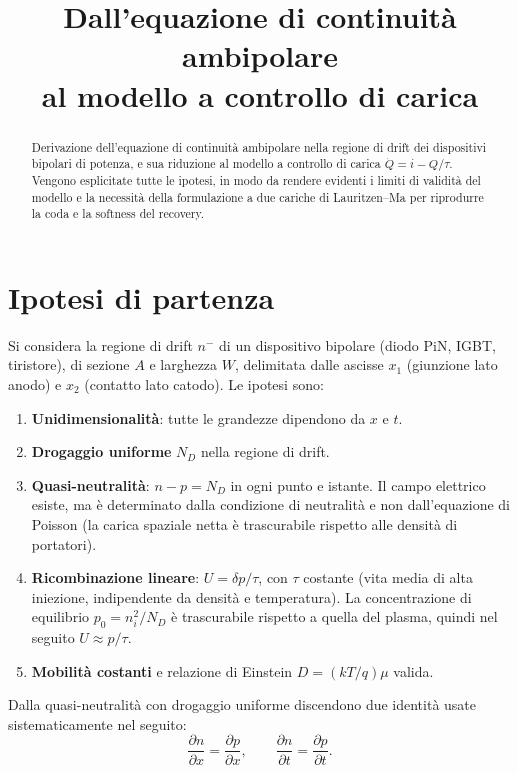 \documentclass[11pt,a4paper]{article}
\title{Dall'equazione di continuit\`a ambipolare\\ al modello a controllo di carica}
\author{}
\date{}
\newcommand{\dpar}[2]{\frac{\partial #1}{\partial #2}}
\begin{document}
\maketitle

\begin{abstract}
\noindent
Derivazione dell'equazione di continuit\`a ambipolare nella regione di drift dei
dispositivi bipolari di potenza, e sua riduzione al modello a controllo di carica
$\dot{Q} = i - Q/\tau$. Vengono esplicitate tutte le ipotesi, in modo da rendere
evidenti i limiti di validit\`a del modello e la necessit\`a della formulazione a
due cariche di Lauritzen--Ma per riprodurre la coda e la softness del recovery.
\end{abstract}

\section{Ipotesi di partenza}

Si considera la regione di drift $n^-$ di un dispositivo bipolare (diodo PiN, IGBT,
tiristore), di sezione $A$ e larghezza $W$, delimitata dalle ascisse $x_1$ (giunzione
lato anodo) e $x_2$ (contatto lato catodo). Le ipotesi sono:

\begin{enumerate}
  \item \textbf{Unidimensionalit\`a}: tutte le grandezze dipendono da $x$ e $t$.
  \item \textbf{Drogaggio uniforme} $N_D$ nella regione di drift.
  \item \textbf{Quasi-neutralit\`a}: $n - p = N_D$ in ogni punto e istante. Il campo
        elettrico esiste, ma \`e determinato dalla condizione di neutralit\`a e non
        dall'equazione di Poisson (la carica spaziale netta \`e trascurabile rispetto
        alle densit\`a di portatori).
  \item \textbf{Ricombinazione lineare}: $U = \delta p / \tau$, con $\tau$ costante
        (vita media di alta iniezione, indipendente da densit\`a e temperatura).
        La concentrazione di equilibrio $p_0 = n_i^2/N_D$ \`e trascurabile rispetto a
        quella del plasma, quindi nel seguito $U \approx p/\tau$.
  \item \textbf{Mobilit\`a costanti} e relazione di Einstein $D = (kT/q)\mu$ valida.
\end{enumerate}

Dalla quasi-neutralit\`a con drogaggio uniforme discendono due identit\`a usate
sistematicamente nel seguito:
\begin{equation}
  \dpar{n}{x} = \dpar{p}{x}, \qquad \dpar{n}{t} = \dpar{p}{t}.
  \label{eq:neutralita}
\end{equation}
\end{document}
